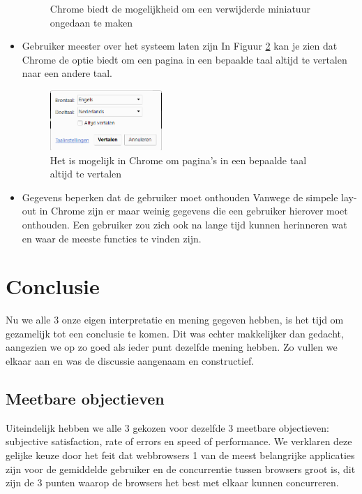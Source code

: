 \documentclass[12pt]{article}
\begin{document}
\begin{itemize}
\begin{figure}
		\caption{Chrome biedt de mogelijkheid om een verwijderde miniatuur ongedaan te maken}
		\label{fig:miniatuur}
	\end{figure}
	\item Gebruiker meester over het systeem laten zijn
	\newline
	In Figuur \ref{fig:vertaalAltijd} kan je zien dat Chrome de optie biedt om een pagina in een bepaalde taal altijd te vertalen naar een andere taal. 
	\begin{figure}
		\centering
		\includegraphics[width=0.4\textwidth]{imgVertaalAltijd.png}
		\caption{Het is mogelijk in Chrome om pagina's in een bepaalde taal altijd te vertalen}
		\label{fig:vertaalAltijd}
	\end{figure}
	\item Gegevens beperken dat de gebruiker moet onthouden
	\newline
	Vanwege de simpele lay-out in Chrome zijn er maar weinig gegevens die een gebruiker hierover moet onthouden. Een gebruiker zou zich ook na lange tijd kunnen herinneren wat en waar de meeste functies te vinden zijn.
\end{itemize}
\newpage


\section{Conclusie}
Nu we alle 3 onze eigen interpretatie en mening gegeven hebben, is het tijd om gezamelijk tot een conclusie te komen. Dit was echter makkelijker dan gedacht, aangezien we op zo goed als ieder punt dezelfde mening hebben. Zo vullen we elkaar aan en was de discussie aangenaam en constructief.
\subsection{Meetbare objectieven}
Uiteindelijk hebben we alle 3 gekozen voor dezelfde 3 meetbare objectieven: subjective satisfaction, rate of errors en speed of performance. We verklaren deze gelijke keuze door het feit dat webbrowsers 1 van de meest belangrijke applicaties zijn voor de gemiddelde gebruiker en de concurrentie tussen browsers groot is, dit zijn de 3 punten waarop de browsers het best met elkaar kunnen concurreren.
\end{document}
